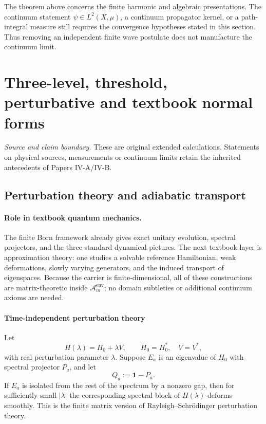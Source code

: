 \documentclass[12pt,a4paper]{article}
\begin{document}
\begin{remark}
The theorem above concerns the finite harmonic and algebraic presentations.
The continuum statement \(\psi\in L^2(X,\mu)\), a continuum propagator kernel,
or a path-integral measure still requires the convergence hypotheses stated in
this section.  Thus removing an independent finite wave postulate does not
manufacture the continuum limit.
\end{remark}



\section{Three-level, threshold, perturbative and textbook normal forms}
\label{p4c:sec:v238-c5}
\noindent\textit{Source and claim boundary.} These are original extended calculations. Statements on physical sources, measurements or continuum limits retain the inherited antecedents of Papers IV-A/IV-B.

\subsection{Perturbation theory and adiabatic transport}
\label{p4:sec:part2-perturbation-adiabatic}

\paragraph{Role in textbook quantum mechanics.}
The finite Born framework already gives exact unitary evolution, spectral projectors, and the three standard dynamical pictures.
The next textbook layer is approximation theory: one studies a solvable reference Hamiltonian, weak deformations, slowly varying generators, and the induced transport of eigenspaces.
Because the carrier is finite-dimensional, all of these constructions are matrix-theoretic inside $\mathcal A_m^{\mathrm{env}}$; no domain subtleties or additional continuum axioms are needed.



\paragraph[Time-independent perturbation theory around isolated levels]
{Time-independent perturbation theory}
\label{p4:sec:part2-timeindep-perturbation}

Let
\begin{equation}
\label{p4:eq:H-lambda}
H(\lambda)=H_0+\lambda V,
\qquad
H_0=H_0^*,\quad V=V^*,
\end{equation}
with real perturbation parameter $\lambda$.
Suppose $E_a$ is an eigenvalue of $H_0$ with spectral projector $P_a$, and let
\begin{equation}
\label{p4:eq:Qa-def}
Q_a:=\mathbf 1-P_a.
\end{equation}
If $E_a$ is isolated from the rest of the spectrum by a nonzero gap, then for sufficiently small $|\lambda|$ the corresponding spectral block of $H(\lambda)$ deforms smoothly.
This is the finite matrix version of Rayleigh--Schr\"odinger perturbation theory.
\end{document}
